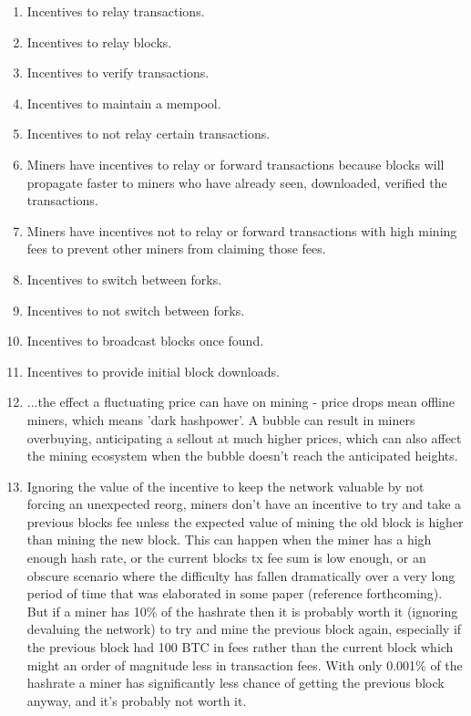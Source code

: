 \documentclass[letterpaper]{article}
\begin{document}
\begin{enumerate}
\item Incentives to relay transactions.

\item Incentives to relay blocks.

\item Incentives to verify transactions.

\item Incentives to maintain a mempool.

\item Incentives to not relay certain transactions.

\item Miners have incentives to relay or forward transactions because blocks
will propagate faster to miners who have already seen, downloaded, verified the
transactions.

\item Miners have incentives not to relay or forward transactions with high mining fees
to prevent other miners from claiming those fees.

\item Incentives to switch between forks.

\item Incentives to not switch between forks.

\item Incentives to broadcast blocks once found.

\item Incentives to provide initial block downloads.

\item ...the effect a fluctuating price can have on mining - price drops mean
offline miners, which means 'dark hashpower'. A bubble can result in miners
overbuying, anticipating a sellout at much higher prices, which can also affect
the mining ecosystem when the bubble doesn't reach the anticipated heights.

\item Ignoring the value of the incentive to keep the network valuable by not
forcing an unexpected reorg, miners don't have an incentive to try and take a
previous blocks fee unless the expected value of mining the old block is higher
than mining the new block. This can happen when the miner has a high enough
hash rate, or the current blocks tx fee sum is low enough, or an obscure
scenario where the difficulty has fallen dramatically over a very long period
of time that was elaborated in some paper (reference forthcoming). But if a
miner has 10\% of the hashrate then it is probably worth it (ignoring devaluing
the network) to try and mine the previous block again, especially if the
previous block had 100 BTC in fees rather than the current block which might an
order of magnitude less in transaction fees. With only 0.001\% of the hashrate
a miner has significantly less chance of getting the previous block anyway, and
it's probably not worth it.


\end{enumerate}
\end{document}
